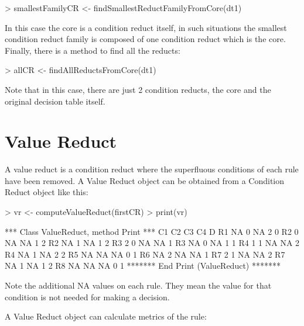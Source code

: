 \documentclass[a4paper]{article}
\begin{document}
\begin{Schunk}
\begin{Sinput}
> smallestFamilyCR <- findSmallestReductFamilyFromCore(dt1)
\end{Sinput}
\end{Schunk}

In this case the core is a condition reduct itself, in such situations the smallest condition reduct family is composed of one condition reduct which is the core. Finally, there is a method to find all the reducts:

\begin{Schunk}
\begin{Sinput}
> allCR <- findAllReductsFromCore(dt1)
\end{Sinput}
\end{Schunk}

Note that in this case, there are just 2 condition reducts, the core and the original decision table itself.

\section{Value Reduct}
A value reduct is a condition reduct where the superfluous conditions of each rule have been removed. A Value Reduct object can be obtained from a Condition Reduct object like this:

\begin{Schunk}
\begin{Sinput}
> vr <- computeValueReduct(firstCR)
> print(vr)
\end{Sinput}
\begin{Soutput}
*** Class ValueReduct, method Print *** 
   C1 C2 C3 C4 D
R1 NA 0  NA 2  0
R2 0  NA NA 1  2
R2 NA 1  NA 1  2
R3 2  0  NA NA 1
R3 NA 0  NA 1  1
R4 1  1  NA NA 2
R4 NA 1  NA 2  2
R5 NA NA NA 0  1
R6 NA 2  NA NA 1
R7 2  1  NA NA 2
R7 NA 1  NA 1  2
R8 NA NA NA 0  1
******* End Print (ValueReduct) ******* 
\end{Soutput}
\end{Schunk}

Note the additional NA values on each rule. They mean the value for that condition is not needed for making a decision. 

A Value Reduct object can calculate metrics of the rule:
\end{document}
